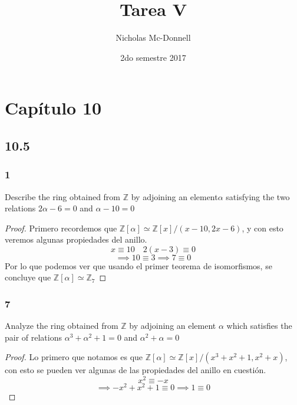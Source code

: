 \documentclass[11pt]{article}
\title{Tarea V}
\author{Nicholas Mc-Donnell}
\date{2do semestre 2017}
\newcommand{\set}[1]{\mathbb{#1}}
\theoremstyle{definition}
\begin{document}
        \maketitle
        \newpage

        \tableofcontents
        \newpage
        \section{Capítulo 10}
        \subsection{10.5}
        \subsubsection{1}
        Describe the ring obtained from $\set{Z}$ by adjoining an element$\alpha$ satisfying the two relations $2\alpha-6=0$ and $\alpha-10=0$
        \begin{proof}
            Primero recordemos que $\set{Z}[\alpha]\simeq\set{Z}[x]/(x-10,2x-6)$, y con esto veremos algunas propiedades del anillo.
            \[x\equiv 10\quad2(x-3)\equiv0\]
            \[\implies 10\equiv 3\implies 7\equiv 0\]
            Por lo que podemos ver que usando el primer teorema de isomorfismos, se concluye que $\set{Z}[\alpha]\simeq\set{Z}_7$
        \end{proof}

        \subsubsection{7}
        Analyze the ring obtained from $\set{Z}$ by adjoining an element $\alpha$ which satisfies the pair of relations $\alpha^3+\alpha^2+1=0$ and $\alpha^2+\alpha=0$
        \begin{proof}
            Lo primero que notamos es que $\set{Z}[\alpha]\simeq\set{Z}[x]/(x^3+x^2+1,x^2+x)$, con esto se pueden ver algunas de las propiedades del anillo en cuestión.
            \[x^2\equiv-x\]
            \[\implies -x^2+x^2+1\equiv 0\implies 1\equiv 0\]
        \end{proof}
\end{document}
